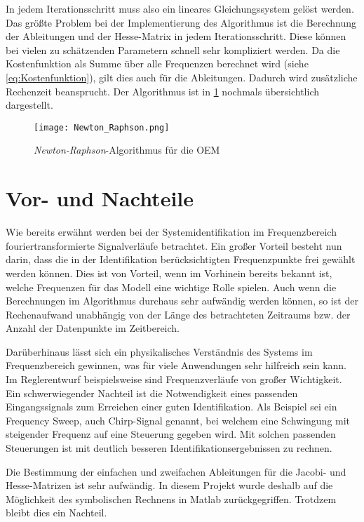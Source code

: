 In jedem Iterationsschritt muss also ein lineares Gleichungssystem gelöst werden. Das größte Problem bei der Implementierung 
des Algorithmus ist die Berechnung der Ableitungen und der Hesse-Matrix in jedem Iterationsschritt. Diese können bei vielen 
zu schätzenden Parametern schnell sehr kompliziert werden. Da die Kostenfunktion als Summe über alle Frequenzen berechnet 
wird (siehe \cref{eq:Kostenfunktion}), gilt dies auch für die Ableitungen. Dadurch wird zusätzliche Rechenzeit 
beansprucht. Der Algorithmus ist in \cref{fig:Newton_Raphson} nochmals übersichtlich dargestellt.  

\begin{figure}[h!]
	\centering
	\texttt{[image: Newton\_Raphson.png]}
	\caption{\textit{Newton-Raphson}-Algorithmus für die OEM}
	\label{fig:Newton_Raphson}
\end{figure}

\section{Vor- und Nachteile}
Wie bereits erwähnt werden bei der Systemidentifikation im Frequenzbereich fouriertransformierte Signalverläufe betrachtet. 
Ein großer Vorteil besteht nun darin, dass die in der Identifikation berücksichtigten Frequenzpunkte frei gewählt werden 
können. Dies ist von Vorteil, wenn im Vorhinein bereits bekannt ist, welche Frequenzen für das Modell eine wichtige Rolle 
spielen. Auch wenn die Berechnungen im Algorithmus durchaus sehr aufwändig werden können, so ist der Rechenaufwand unabhängig 
von der Länge des betrachteten Zeitraums bzw. der Anzahl der Datenpunkte im Zeitbereich.

Darüberhinaus lässt sich ein physikalisches Verständnis des Systems im Frequenzbereich gewinnen, was für viele Anwendungen 
sehr hilfreich sein kann. Im Reglerentwurf beispielsweise sind Frequenzverläufe von großer Wichtigkeit.\\

Ein schwerwiegender Nachteil ist die Notwendigkeit eines passenden Eingangssignals zum Erreichen einer guten Identifikation. 
Als Beispiel sei ein Frequency Sweep, auch Chirp-Signal genannt, bei welchem eine Schwingung mit steigender Frequenz auf eine 
Steuerung gegeben wird. Mit solchen passenden Steuerungen ist mit deutlich besseren Identifikationsergebnissen zu rechnen.

Die Bestimmung der einfachen und zweifachen Ableitungen für die Jacobi- und Hesse-Matrizen ist sehr aufwändig. In diesem 
Projekt wurde deshalb auf die Möglichkeit des symbolischen Rechnens in Matlab zurückgegriffen. Trotdzem bleibt dies ein 
Nachteil.

